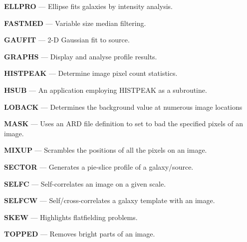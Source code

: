 \documentclass[twoside,11pt]{article}
\begin{document}
{\bf ELLPRO}{ --- Ellipse fits galaxies by intensity analysis.}
\pageref{des:ellpro}

{\bf FASTMED}{ --- Variable size median filtering.}
\pageref{des:fast}

{\bf GAUFIT}{ --- 2-D Gaussian fit to source.}
\pageref{des:gaufit}

{\bf GRAPHS}{ --- Display and analyse profile results.}
\pageref{des:graphs}

{\bf HISTPEAK}{ --- Determine image pixel count statistics.}
\pageref{des:histpeak}

{\bf HSUB}{ --- An application employing HISTPEAK as a subroutine.}
\pageref{des:hsub}

{\bf LOBACK}{ --- Determines the background value at numerous image locations}
\pageref{des:loback}

{\bf MASK}{ --- Uses an ARD file definition to set to bad the specified pixels
of an image.}
\pageref{des:mask}

{\bf MIXUP}{ --- Scrambles the positions of all the pixels on an image.}
\pageref{des:mixup}

{\bf SECTOR}{ --- Generates a pie-slice profile of a galaxy/source.}
\pageref{des:sector}

{\bf SELFC}{ --- Self-correlates an image on a given scale.}
\pageref{des:selfc}

{\bf SELFCW}{ --- Self/cross-correlates a galaxy template with an image.}
\pageref{des:selfcw}

{\bf SKEW}{ --- Highlights flatfielding problems.}
\pageref{des:skew}

{\bf TOPPED}{ --- Removes bright parts of an image.}
\pageref{des:topped}
\end{document}
